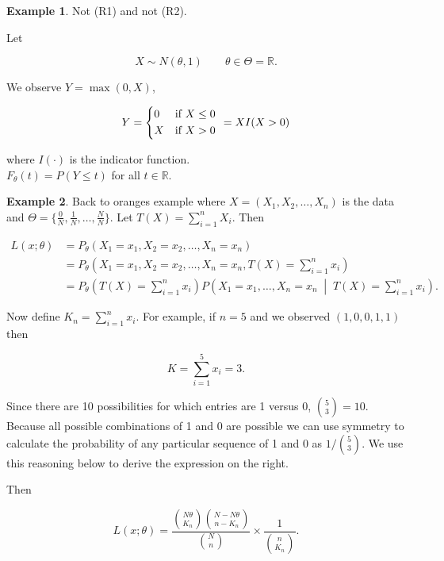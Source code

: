 \documentclass[12pt]{article}
\theoremstyle{definition}
\newtheorem*{example}{Example}
\begin{document}
\begin{example}
Not (R1) and not (R2).

Let

$$ X \sim N(\theta, 1) \quad\quad \theta \in \Theta = \mathbb{R}. $$

We observe $Y = \max(0, X)$, 

\begin{equation*}
Y =
\begin{cases*}
0 & if $X \leq 0 $\\
X & if $ X > 0$
\end{cases*}
= X I(X > 0)
\end{equation*}

where $I(\cdot)$ is the indicator function.\\

$F_{\theta} (t) = P(Y \leq t)$ for all $t \in \mathbb{R}$.
\end{example}

\begin{example}
Back to oranges example where $X = (X_1, X_2, \ldots, X_n)$ is the data
and $\Theta = \{ \frac{0}{N}, \frac{1}{N}, \ldots, \frac{N}{N} \}$. Let
$\displaystyle T(X) = \sum^{n}_{i=1} X_i$. Then

\begin{align*}
L(x; \theta) &= P_{\theta}(X_1 = x_1, X_2 = x_2, \ldots, X_n = x_n) \\
&= P_{\theta}\left(X_1 = x_1, X_2 = x_2, \ldots, X_n = x_n, T(X) = \sum^{n}_{i=1} x_i \right) \\
&= P_{\theta}\left(T(X) = \sum^{n}_{i=1} x_i\right)P\left(X_1 = x_1, \ldots, X_n = x_n \; \middle|\;  T(X) = \sum^{n}_{i=1} x_i \right).
\end{align*}


Now define $K_n = \sum^{n}_{i=1} x_i$. For example, if $n = 5$ and 
we observed $(1, 0, 0, 1, 1)$ then

$$ K = \sum_{i=1}^{5} x_i = 3. $$

Since there are 10 possibilities for which entries are 1 versus 0,
$\binom{5}{3} = 10$. Because all possible combinations of 1 and 0 
are possible we can use symmetry to calculate the probability of
any particular sequence of 1 and 0 as $1/\binom{5}{3}$. We use 
this reasoning below to derive the expression on the right. 

Then

\begin{equation*}
L(x; \theta) = \frac{ \binom{N\theta}{K_n} \binom{N-N\theta}{n - K_n}}
{\binom{N}{n}} \times \frac{1}{\binom{n}{K_n}}.
\end{equation*}
\end{example}
\end{document}
